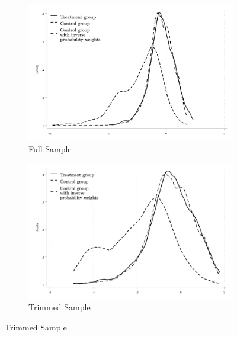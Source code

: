 \documentclass[11pt]{article}
\begin{document}
\begin{figure}[H]
\caption{Linearized Propensity Score Distribution}
    \centering
    \begin{subfigure}[t]{.49\textwidth}
    \centering
        \caption{Full Sample} \label{figure:E2_PD_Annual}
        \includegraphics[width=\linewidth,trim=4 4 4 4,clip]{pscore_dens.png} 
    \end{subfigure}
    \begin{subfigure}[t]{0.49\textwidth}
        \centering
        \caption{Trimmed Sample} \label{figure:E2_PD_Festival}
        \includegraphics[width=\linewidth,trim=4 4 4 4,clip]{pscore_dens_comm.png} 
    \end{subfigure}
\end{figure}
\end{document}
